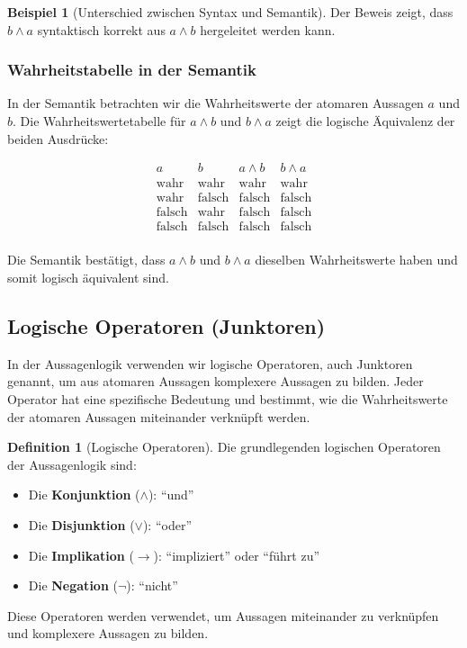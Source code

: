 \documentclass{book}
\theoremstyle{plain}
\theoremstyle{remark}
\theoremstyle{definition}
\newtheorem{definition}{Definition}[section]
\newtheorem*{example}{Beispiel}
\begin{document}
\begin{example}[Unterschied zwischen Syntax und Semantik]
Der Beweis zeigt, dass \(b \land a\) syntaktisch korrekt aus \(a \land b\) hergeleitet werden kann.

\subsubsection*{Wahrheitstabelle in der Semantik}
In der Semantik betrachten wir die Wahrheitswerte der atomaren Aussagen \(a\) und \(b\). Die Wahrheitswertetabelle für \(a \land b\) und \(b \land a\) zeigt die logische Äquivalenz der beiden Ausdrücke:

\[
\begin{array}{c|c|c|c}
    a & b & a \land b & b \land a \\
    \hline
    \text{wahr} & \text{wahr} & \text{wahr} & \text{wahr} \\
    \text{wahr} & \text{falsch} & \text{falsch} & \text{falsch} \\
    \text{falsch} & \text{wahr} & \text{falsch} & \text{falsch} \\
    \text{falsch} & \text{falsch} & \text{falsch} & \text{falsch} \\
\end{array}
\]

Die Semantik bestätigt, dass \(a \land b\) und \(b \land a\) dieselben Wahrheitswerte haben und somit logisch äquivalent sind.

\end{example}
\subsection{Logische Operatoren (Junktoren)}

In der Aussagenlogik verwenden wir logische Operatoren, auch Junktoren genannt, um aus atomaren Aussagen komplexere Aussagen zu bilden. Jeder Operator hat eine spezifische Bedeutung und bestimmt, wie die Wahrheitswerte der atomaren Aussagen miteinander verknüpft werden.

\begin{definition}[Logische Operatoren]
Die grundlegenden logischen Operatoren der Aussagenlogik sind:
\begin{itemize}
    \item Die \textbf{Konjunktion} (\(\land\)): "`und"'
    \item Die \textbf{Disjunktion} (\(\lor\)): "`oder"'
    \item Die \textbf{Implikation} (\(\rightarrow\)): "`impliziert"' oder "`führt zu"'
    \item Die \textbf{Negation} (\(\neg\)): "`nicht"'
\end{itemize}
Diese Operatoren werden verwendet, um Aussagen miteinander zu verknüpfen und komplexere Aussagen zu bilden.
\end{definition}
\end{document}
